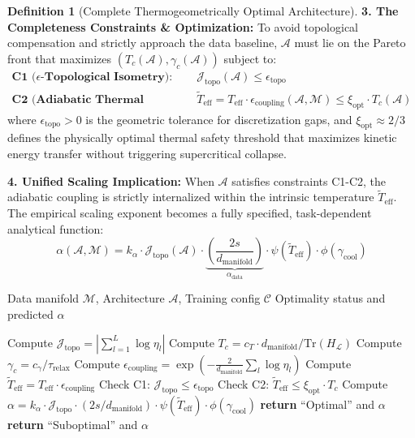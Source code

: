 \documentclass[11pt, a4paper]{article}
\theoremstyle{definition}
\newtheorem{definition}{Definition}[section]
\begin{document}
\begin{definition}[Complete Thermogeometrically Optimal Architecture]
\textbf{3. The Completeness Constraints \& Optimization:}
To avoid topological compensation and strictly approach the data baseline, $\mathcal{A}$ must lie on the Pareto front that maximizes $(T_c(\mathcal{A}), \gamma_c(\mathcal{A}))$ subject to:
\begin{align}
 \textbf{C1 ($\epsilon$-Topological Isometry):} \quad & \mathcal{J}_{\text{topo}}(\mathcal{A}) \leq \epsilon_{\text{topo}} \label{eq:c1_topo_complete} \\
 \textbf{C2 (Adiabatic Thermal Safety):} \quad & \tilde{T}_{\text{eff}} = T_{\text{eff}} \cdot \epsilon_{\text{coupling}}(\mathcal{A}, \mathcal{M}) \leq \xi_{\text{opt}} \cdot T_c(\mathcal{A}) \label{eq:c2_thermal_complete}
\end{align}
where $\epsilon_{\text{topo}} > 0$ is the geometric tolerance for discretization gaps, and $\xi_{\text{opt}} \approx 2/3$ defines the physically optimal thermal safety threshold that maximizes kinetic energy transfer without triggering supercritical collapse.

\textbf{4. Unified Scaling Implication:}
When $\mathcal{A}$ satisfies constraints C1-C2, the adiabatic coupling is strictly internalized within the intrinsic temperature $\tilde{T}_{\text{eff}}$. The empirical scaling exponent becomes a fully specified, task-dependent analytical function:
\begin{equation}
 \alpha(\mathcal{A}, \mathcal{M}) = k_\alpha \cdot \mathcal{J}_{\text{topo}}(\mathcal{A}) \cdot \underbrace{\left( \frac{2s}{d_{\text{manifold}}} \right)}_{\alpha_{\text{data}}} \cdot \psi(\tilde{T}_{\text{eff}}) \cdot \phi(\gamma_{\text{cool}})
 \label{eq:complete_scaling_implication}
\end{equation}
\end{definition}

\begin{algorithm}[htbp]
\caption{Thermogeometric Optimality Verification}
\label{alg:optimality-verification}
\begin{algorithmic}[1]
\REQUIRE Data manifold $\mathcal{M}$, Architecture $\mathcal{A}$, Training config $\mathcal{C}$
\ENSURE Optimality status and predicted $\alpha$

\STATE Compute $\mathcal{J}_{\text{topo}} = \left|\sum_{l=1}^L \log \eta_l\right|$
\STATE Compute $T_c = c_T \cdot d_{\text{manifold}} / \text{Tr}(H_{\mathcal{L}})$
\STATE Compute $\gamma_c = c_\gamma / \tau_{\text{relax}}$
\STATE Compute $\epsilon_{\text{coupling}} = \exp\left(-\frac{2}{d_{\text{manifold}}}\sum_l \log \eta_l\right)$
\STATE Compute $\tilde{T}_{\text{eff}} = T_{\text{eff}} \cdot \epsilon_{\text{coupling}}$
\STATE Check C1: $\mathcal{J}_{\text{topo}} \leq \epsilon_{\text{topo}}$
\STATE Check C2: $\tilde{T}_{\text{eff}} \leq \xi_{\text{opt}} \cdot T_c$
\STATE Compute $\alpha = k_\alpha \cdot \mathcal{J}_{\text{topo}} \cdot (2s/d_{\text{manifold}}) \cdot \psi(\tilde{T}_{\text{eff}}) \cdot \phi(\gamma_{\text{cool}})$
 \STATE \textbf{return} ``Optimal'' and $\alpha$
\ELSE
 \STATE \textbf{return} ``Suboptimal'' and $\alpha$
\ENDIF
\end{algorithmic}
\end{algorithm}
\end{document}
